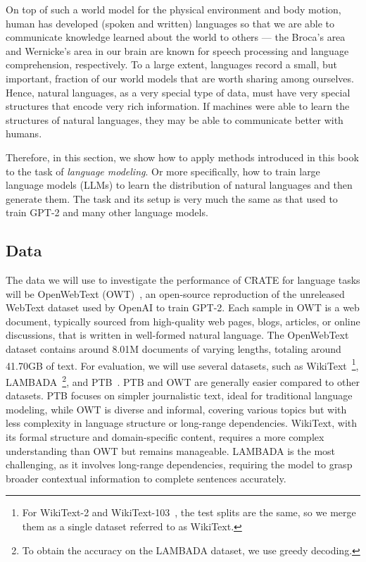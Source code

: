 \documentclass[../../book-main.tex]{subfiles}
\begin{document}
On top of such a world model for the physical environment and body
motion, human has developed (spoken and written) languages so that we
are able to communicate knowledge learned about the world to others
--- the Broca's area and Wernicke's area in our brain are known for
speech processing and language comprehension, respectively. To a
large extent, languages record a small, but important, fraction of
our world models that are worth sharing among ourselves. Hence,
natural languages, as a very special type of data, must have very
special structures that encode very rich information. If machines
were able to learn the structures of natural languages, they may be
able to communicate better with humans.

Therefore, in this section, we show how to apply methods introduced
in this book to the task of \textit{language modeling}. Or more
specifically, how to train large language models (LLMs) to learn the
distribution of natural languages and then generate them. The task
and its setup is very much the same as that used to train GPT-2 and
many other language models.

\subsection{Data} \label{sub:clm_text_data}

The data we will use to investigate the performance of CRATE for
language tasks will be OpenWebText (OWT)~\citep{Gokaslan2019OpenWeb},
an open-source reproduction of the unreleased WebText dataset used by
OpenAI to train GPT-2. Each sample in OWT is a web document, typically
sourced from high-quality web pages, blogs, articles, or online
discussions, that is written in well-formed natural language. The
OpenWebText dataset contains around 8.01M documents of varying
lengths, totaling around 41.70GB of text. For evaluation, we will use
several datasets, such as
WikiText~\citep{merity2016pointer}\footnote{For WikiText-2 and
WikiText-103~\citep{merity2016pointer}, the test splits are the same,
so we merge them as a single dataset referred to as WikiText.},
LAMBADA~\citep{paperno2016lambadadatasetwordprediction}\footnote{To
obtain the accuracy on the LAMBADA dataset, we use greedy decoding.},
and PTB~\citep{marcus-etal-1993-building}. PTB and OWT are generally
easier compared to other datasets. PTB focuses on simpler
journalistic text, ideal for traditional language modeling, while OWT
is diverse and informal, covering various topics but with less
complexity in language structure or long-range dependencies.
WikiText, with its formal structure and domain-specific content,
requires a more complex understanding than OWT but remains
manageable. LAMBADA is the most challenging, as it involves
long-range dependencies, requiring the model to grasp broader
contextual information to complete sentences accurately.
\end{document}
